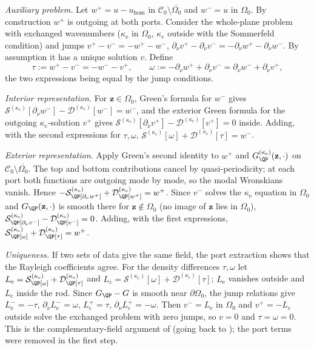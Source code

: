 \emph{Auxiliary problem.} Let $w^+=u-u_{\mathrm{hom}}$ in
$\mathcal C_0\setminus\overline{\Omega_0}$ and $w^-=u$ in $\Omega_0$. By construction
$w^+$ is outgoing at both ports. Consider the whole-plane problem with exchanged
wavenumbers ($\kappa_{\mathrm e}$ in $\Omega_0$, $\kappa_{\mathrm c}$ outside with the
Sommerfeld condition) and jumps $v^+-v^-=-w^+-w^-$,
$\partial_\nu v^+-\partial_\nu v^-=-\partial_\nu w^+-\partial_\nu w^-$. By assumption it
has a unique solution $v$. Define
\[
  \tau:=w^+-v^-=-w^--v^+,\qquad
  \omega:=-\partial_\nu w^++\partial_\nu v^-=\partial_\nu w^-+\partial_\nu v^+ ,
\]
the two expressions being equal by the jump conditions.

\emph{Interior representation.} For $\mathbf z\in\Omega_0$, Green's formula for
$w^-$ gives $\mathcal S^{(\kappa_{\mathrm c})}[\partial_\nu w^-]-
\mathcal D^{(\kappa_{\mathrm c})}[w^-]=w^-$, and the exterior Green formula for the
outgoing $\kappa_{\mathrm c}$-solution $v^+$ gives
$\mathcal S^{(\kappa_{\mathrm c})}[\partial_\nu v^+]-\mathcal D^{(\kappa_{\mathrm c})}[v^+]=0$
inside. Adding, with the second expressions for $\tau,\omega$,
$\mathcal S^{(\kappa_{\mathrm c})}[\omega]+\mathcal D^{(\kappa_{\mathrm c})}[\tau]=w^-$.

\emph{Exterior representation.} Apply Green's second identity to $w^+$ and
$G^{(\kappa_{\mathrm e})}_\QP(\mathbf z,\cdot)$ on $\mathcal C_0\setminus\overline{\Omega_0}$.
The top and bottom contributions cancel by quasi-periodicity; at each port both
functions are outgoing mode by mode, so the modal Wronskians vanish. Hence
$-\mathcal S^{(\kappa_{\mathrm e})}_\QP[\partial_\nu w^+]+\mathcal D^{(\kappa_{\mathrm e})}_\QP[w^+]=w^+$.
Since $v^-$ solves the $\kappa_{\mathrm e}$ equation in $\Omega_0$ and
$G_\QP(\mathbf z,\cdot)$ is smooth there for $\mathbf z\notin\Omega_0$ (no image of
$\mathbf z$ lies in $\Omega_0$),
$\mathcal S^{(\kappa_{\mathrm e})}_\QP[\partial_\nu v^-]-\mathcal D^{(\kappa_{\mathrm e})}_\QP[v^-]=0$.
Adding, with the first expressions,
$\mathcal S^{(\kappa_{\mathrm e})}_\QP[\omega]+\mathcal D^{(\kappa_{\mathrm e})}_\QP[\tau]=w^+$.

\emph{Uniqueness.} If two sets of data give the same field, the port extraction
shows that the Rayleigh coefficients agree. For the density differences $\tau,\omega$
let $L_{\mathrm e}=\mathcal S^{(\kappa_{\mathrm e})}_\QP[\omega]+\mathcal D^{(\kappa_{\mathrm e})}_\QP[\tau]$
and $L_{\mathrm c}=\mathcal S^{(\kappa_{\mathrm c})}[\omega]+\mathcal D^{(\kappa_{\mathrm c})}[\tau]$;
$L_{\mathrm e}$ vanishes outside and $L_{\mathrm c}$ inside the rod. Since $G_\QP-G$
is smooth near $\partial\Omega_0$, the jump relations give $L_{\mathrm e}^-=-\tau$,
$\partial_\nu L_{\mathrm e}^-=\omega$, $L_{\mathrm c}^+=\tau$,
$\partial_\nu L_{\mathrm c}^+=-\omega$. Then $v^-=L_{\mathrm e}$ in $\Omega_0$ and
$v^+=-L_{\mathrm c}$ outside solve the exchanged problem with zero jumps, so $v=0$
and $\tau=\omega=0$. This is the complementary-field argument of
\cite[App.~A]{BarnettGreengard2010} (going back to \cite{ColtonKress1983}); the
port terms were removed in the first step.

